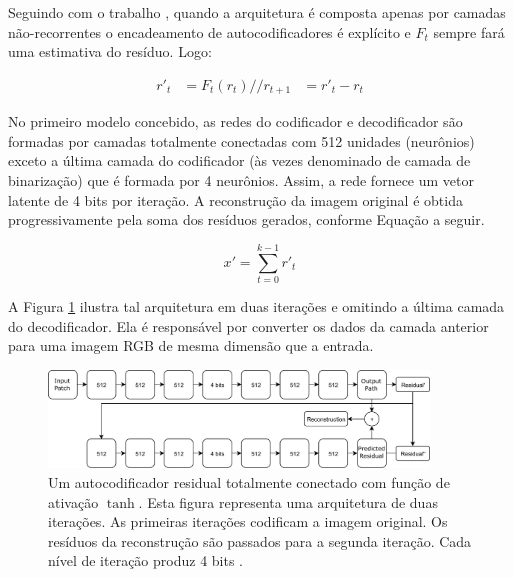 Seguindo com  o trabalho \cite{Variable2016Toderici}, quando a arquitetura é composta apenas por camadas não-recorrentes o encadeamento de autocodificadores é explícito e $F_t$ sempre fará uma estimativa do resíduo. Logo:


\begin{equation}
\label{eq:reconst_escalar}
\begin{aligned}
r'_{t}  &= F_t(r_{t}) //
r_{t+1} &= r'_{t} - r_{t}
\end{aligned}
\end{equation}

No primeiro modelo concebido, as redes do codificador e decodificador são formadas por camadas totalmente conectadas com 512 unidades (neurônios) exceto a última camada do codificador (às vezes denominado de camada de binarização) que é formada por 4 neurônios. Assim, a rede fornece um vetor latente de 4 bits por iteração. A reconstrução da imagem original é obtida progressivamente pela soma dos resíduos gerados, conforme Equação a seguir.

\begin{equation}
x' = \sum_{t=0}^{k-1} r'_{t}
\end{equation}


A Figura  \ref{fig:toderici1} ilustra tal arquitetura em duas iterações e omitindo a última camada do decodificador. Ela é responsável por converter os dados da camada anterior para uma imagem RGB de mesma dimensão que a entrada.




\begin{figure}[h]
	\centering
	\includegraphics[width=0.90\textwidth]{figuras/toderici_1.pdf}
	\caption[Autocodificador residual totalmente conectado.]{Um autocodificador residual totalmente conectado com  função de ativação $\tanh$. Esta figura representa uma arquitetura de duas iterações. As primeiras iterações codificam a imagem original. Os resíduos da reconstrução são passados para a segunda iteração. Cada nível de iteração produz 4 bits \cite{Variable2016Toderici}.}
	\label{fig:toderici1}
\end{figure}


